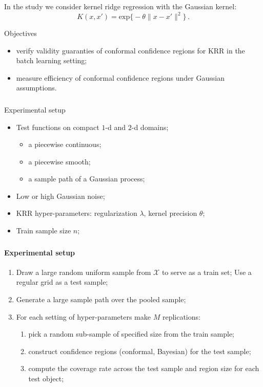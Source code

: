 \documentclass[t]{beamer}  %
\newcommand{\Xcal}{\mathcal{X}}
\begin{document}
\begin{frame}[c]\frametitle{\insertsection}
  In the study we consider kernel ridge regression with the Gaussian kernel:
  $$ K(x,x') = \text{exp}\bigl\{ -\theta \|x-x'\|^2 \bigr\} \,. $$
  \begin{block}{Objectives}
    \begin{itemize}
      \item verify validity guaranties of conformal confidence regions for KRR in
      the batch learning setting;
      \item measure efficiency of conformal confidence regions under Gaussian
      assumptions.
    \end{itemize}
  \end{block}
\end{frame}

\begin{frame}[t]\frametitle{\insertsection}
  \begin{block}{Experimental setup}
  \end{block}
  \begin{itemize}
    \item Test functions on compact $1$-d and $2$-d domains; \begin{itemize}
      \item a piecewise continuous;
      \item a piecewise smooth;
      \item a sample path of a Gaussian process;
    \end{itemize}
    \vspace{\baselineskip}
    \item Low or high Gaussian noise;
    \item KRR hyper-parameters: regularization $\lambda$, kernel precision $\theta$;
    \item Train sample size $n$;
  \end{itemize}
\end{frame}

\begin{frame}[c]\frametitle{\insertsection}
  \framesubtitle{Experimental setup}
  \begin{enumerate}
    \item Draw a large random uniform sample from $\Xcal$ to serve as a train set;
      Use a regular grid as a test sample;
    \item Generate a large sample path over the pooled sample;
    \item For each setting of hyper-parameters make $M$ replications: \begin{enumerate}
      \item pick a random sub-sample of specified size from the train sample;
      \item construct confidence regions (conformal, Bayesian) for the test sample;
      \item compute the coverage rate across the test sample and region size for each test object;
    \end{enumerate}
  \end{enumerate}
\end{frame}
\end{document}
